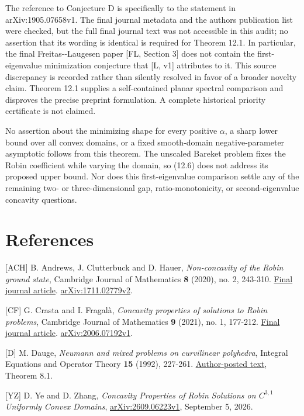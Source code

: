 \documentclass[11pt]{article}
\begin{document}
The reference to Conjecture D is specifically to the statement in
arXiv:1905.07658v1. The final journal metadata and the
author\textquotesingle s publication list were checked, but the full
final journal text was not accessible in this audit; no assertion that
its wording is identical is required for Theorem 12.1. In particular,
the final Freitas-\/-Laugesen paper {[}FL, Section 3{]} does not contain
the first-eigenvalue minimization conjecture that {[}L, v1{]} attributes
to it. This source discrepancy is recorded rather than silently resolved
in favor of a broader novelty claim. Theorem 12.1 supplies a
self-contained planar spectral comparison and disproves the precise
preprint formulation. A complete historical priority certificate is not
claimed.

No assertion about the minimizing shape for every positive \(\alpha\), a
sharp lower bound over all convex domains, or a fixed smooth-domain
negative-parameter asymptotic follows from this theorem. The unscaled
Bareket problem fixes the Robin coefficient while varying the domain, so
(12.6) does not address its proposed upper bound. Nor does this
first-eigenvalue comparison settle any of the remaining two- or
three-dimensional gap, ratio-monotonicity, or second-eigenvalue
concavity questions.

\sloppy\section{References}\label{references}

{[}ACH{]} B. Andrews, J. Clutterbuck and D. Hauer, \emph{Non-concavity
of the Robin ground state}, Cambridge Journal of Mathematics \textbf{8}
(2020), no. 2, 243-310.
\href{https://doi.org/10.4310/CJM.2020.v8.n2.a1}{Final journal article}.
\href{https://arxiv.org/abs/1711.02779v2}{arXiv:1711.02779v2}.

{[}CF{]} G. Crasta and I. Fragalà, \emph{Concavity properties of
solutions to Robin problems}, Cambridge Journal of Mathematics
\textbf{9} (2021), no. 1, 177-212.
\href{https://doi.org/10.4310/CJM.2021.v9.n1.a3}{Final journal article}.
\href{https://arxiv.org/abs/2006.07192v1}{arXiv:2006.07192v1}.

{[}D{]} M. Dauge, \emph{Neumann and mixed problems on curvilinear
polyhedra}, Integral Equations and Operator Theory \textbf{15} (1992),
227-261.
\href{https://dauge.pages.math.cnrs.fr/publis/DaugeMixed92.pdf}{Author-posted
text}, Theorem 8.1.

{[}YZ{]} D. Ye and D. Zhang, \emph{Concavity Properties of Robin
Solutions on \(C^{3,1}\) Uniformly Convex Domains},
\href{https://arxiv.org/abs/2609.06223v1}{arXiv:2609.06223v1}, September
5, 2026.
\end{document}
